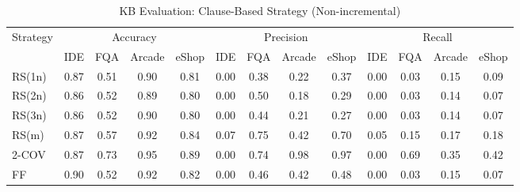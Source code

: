 \begin{table}[htbp]
\centering
\caption{KB Evaluation: Clause-Based Strategy (Non-incremental)}
\label{tab:kb_eval_clause}
\begin{tabular}{l|cccc|cccc|cccc}
\toprule
\multirow{2}{*}{Strategy}
    & \multicolumn{4}{c|}{Accuracy}
    & \multicolumn{4}{c|}{Precision}
    & \multicolumn{4}{c}{Recall} \\
    & IDE & FQA & Arcade & eShop
    & IDE & FQA & Arcade & eShop
    & IDE & FQA & Arcade & eShop \\
\midrule
RS(1n) & 0.87 & 0.51 & 0.90 & 0.81 & 0.00 & 0.38 & 0.22 & 0.37 & 0.00 & 0.03 & 0.15 & 0.09 \\
RS(2n) & 0.86 & 0.52 & 0.89 & 0.80 & 0.00 & 0.50 & 0.18 & 0.29 & 0.00 & 0.03 & 0.14 & 0.07 \\
RS(3n) & 0.86 & 0.52 & 0.90 & 0.80 & 0.00 & 0.44 & 0.21 & 0.27 & 0.00 & 0.03 & 0.14 & 0.07 \\
RS(m)  & 0.87 & 0.57 & 0.92 & 0.84 & 0.07 & 0.75 & 0.42 & 0.70 & 0.05 & 0.15 & 0.17 & 0.18 \\
2-COV  & 0.87 & 0.73 & 0.95 & 0.89 & 0.00 & 0.74 & 0.98 & 0.97 & 0.00 & 0.69 & 0.35 & 0.42 \\
FF     & 0.90 & 0.52 & 0.92 & 0.82 & 0.00 & 0.46 & 0.42 & 0.48 & 0.00 & 0.03 & 0.15 & 0.07 \\
\bottomrule
\end{tabular}
\end{table}


